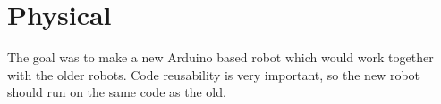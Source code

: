 \section{Physical}
The goal was to make a new Arduino based robot which would work together with the older robots. Code reusability is very important, so the new robot should run on the same code as the old.


